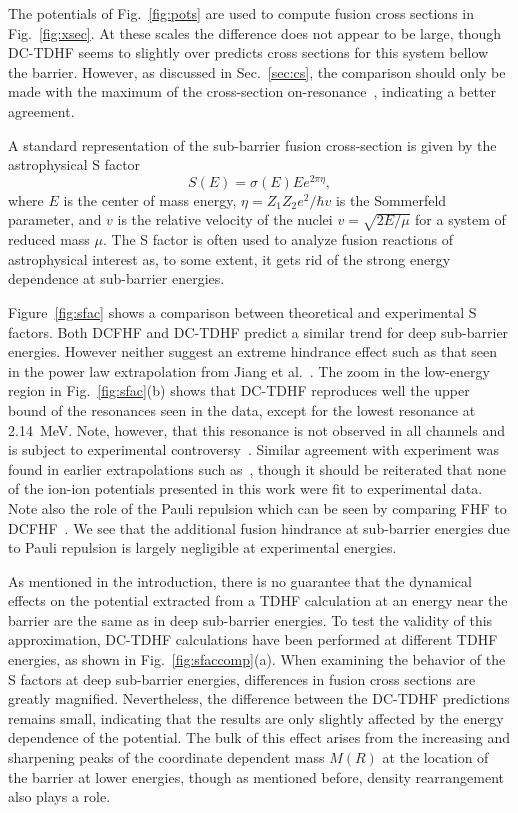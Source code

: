 The potentials of Fig.~\ref{fig:pots} are used to compute fusion cross sections in Fig.~\ref{fig:xsec}.
At these scales the difference does not appear to be large, though DC-TDHF seems to slightly over predicts cross sections for this system bellow the barrier.
However, as discussed in Sec.~\ref{sec:cs}, the comparison should only be made with the maximum of the cross-section on-resonance~\protect\cite{jiang2013}, indicating a better agreement. 

A standard representation of the sub-barrier fusion cross-section is given by the astrophysical S factor 
\begin{equation}
S(E)=\sigma(E)Ee^{2\pi \eta},
\end{equation}
where $E$ is the center of mass energy, $\eta=Z_1Z_2e^2/\hbar v$ is the Sommerfeld parameter, and $v$ is the relative velocity of the nuclei $v=\sqrt{2E/\mu}$ for a system of reduced mass $\mu$.
The S factor is often used to analyze fusion reactions of astrophysical interest as, to some extent, it gets rid of the strong energy dependence at sub-barrier energies.

Figure~\ref{fig:sfac} shows a comparison between theoretical and experimental S factors. 
Both DCFHF and DC-TDHF predict a similar trend for deep sub-barrier energies.
However neither suggest an extreme hindrance effect such as that seen in the power law extrapolation from Jiang et al.~\protect\cite{jiang2007}.
The zoom in the low-energy region in Fig.~\ref{fig:sfac}(b) shows that DC-TDHF reproduces well the upper bound of the resonances seen in the data, except for the lowest resonance at 2.14~MeV. 
Note, however, that this resonance is not observed in all channels and is subject to experimental controversy~\protect\cite{tang2018}.
Similar agreement with experiment was found in earlier extrapolations such as~\protect\cite{fowler1975,gasques2005}, though it should be reiterated that none of the ion-ion potentials presented in this work were fit to experimental data.
Note also the role of the Pauli repulsion which can be seen by comparing FHF to DCFHF~\protect\cite{simenel2017}. 
We see that the additional fusion hindrance at sub-barrier energies due to Pauli repulsion is largely negligible at experimental energies.

As mentioned in the introduction, there is no guarantee that the dynamical effects on the potential extracted from a TDHF calculation at an energy near the barrier are the same as in deep sub-barrier energies. 
To test the validity of this approximation,  DC-TDHF calculations have been performed at different TDHF energies, as shown in Fig.~\ref{fig:sfaccomp}(a).
When examining the behavior of the S factors at deep sub-barrier energies, differences in fusion cross sections are greatly magnified.
Nevertheless, the difference between the DC-TDHF predictions remains small, indicating that the results are only slightly affected by the energy dependence of the potential. 
The bulk of this effect arises from the increasing and sharpening peaks of the coordinate dependent mass $M(R)$ at the location of the barrier at lower energies, though as mentioned before, density rearrangement also plays a role. 

